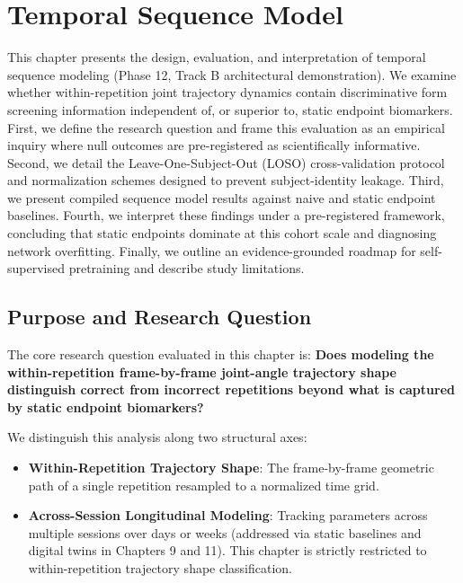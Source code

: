 \chapter{Temporal Sequence Model}
\label{ch:temporal}



This chapter presents the design, evaluation, and interpretation of temporal sequence modeling (Phase 12, Track B architectural demonstration). We examine whether within-repetition joint trajectory dynamics contain discriminative form screening information independent of, or superior to, static endpoint biomarkers. First, we define the research question and frame this evaluation as an empirical inquiry where null outcomes are pre-registered as scientifically informative. Second, we detail the Leave-One-Subject-Out (LOSO) cross-validation protocol and normalization schemes designed to prevent subject-identity leakage. Third, we present compiled sequence model results against naive and static endpoint baselines. Fourth, we interpret these findings under a pre-registered framework, concluding that static endpoints dominate at this cohort scale and diagnosing network overfitting. Finally, we outline an evidence-grounded roadmap for self-supervised pretraining and describe study limitations.



\section{Purpose and Research Question}
\label{sec:13-1-purpose-and-research-question}


The core research question evaluated in this chapter is: \textbf{Does modeling the within-repetition frame-by-frame joint-angle trajectory shape distinguish correct from incorrect repetitions beyond what is captured by static endpoint biomarkers?}

We distinguish this analysis along two structural axes:
\begin{itemize}
  \item \textbf{Within-Repetition Trajectory Shape}: The frame-by-frame geometric path of a single repetition resampled to a normalized time grid.
  \item \textbf{Across-Session Longitudinal Modeling}: Tracking parameters across multiple sessions over days or weeks (addressed via static baselines and digital twins in Chapters 9 and 11). This chapter is strictly restricted to within-repetition trajectory shape classification.
\end{itemize}

